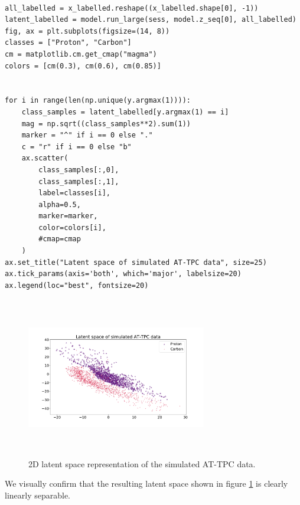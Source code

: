 \begin{minipage}{\linewidth}
\begin{lstlisting}[language=iPython]

all_labelled = x_labelled.reshape((x_labelled.shape[0], -1))
latent_labelled = model.run_large(sess, model.z_seq[0], all_labelled)
fig, ax = plt.subplots(figsize=(14, 8))
classes = ["Proton", "Carbon"]
cm = matplotlib.cm.get_cmap("magma")
colors = [cm(0.3), cm(0.6), cm(0.85)]


for i in range(len(np.unique(y.argmax(1)))):
    class_samples = latent_labelled[y.argmax(1) == i]
    mag = np.sqrt((class_samples**2).sum(1))
    marker = "^" if i == 0 else "."
    c = "r" if i == 0 else "b"
    ax.scatter(
        class_samples[:,0],
        class_samples[:,1],
        label=classes[i],
        alpha=0.5,
        marker=marker,
        color=colors[i],
        #cmap=cmap
    )
ax.set_title("Latent space of simulated AT-TPC data", size=25)
ax.tick_params(axis='both', which='major', labelsize=20)
ax.legend(loc="best", fontsize=20) 
\end{lstlisting}
\end{minipage}

\begin{figure}[H]
\centering
\includegraphics[width=0.7\textwidth, height=7cm]{latent_sim.pdf}
\caption[2D latent space for simulated data]{2D latent space representation of the simulated AT-TPC data.}\label{fig:latent_sim}
\end{figure}

\noindent We visually confirm that the resulting latent space shown in figure \ref{fig:latent_sim} is clearly linearly separable.

